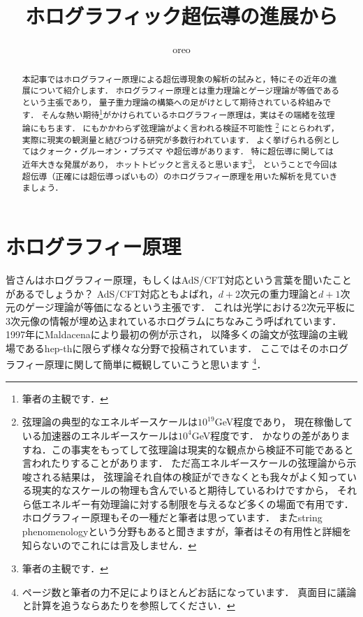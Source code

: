 \documentclass[b5paper,11pt,dvipdfmx]{jsarticle}
\numberwithin{equation}{section}
\theoremstyle{definition}
\begin{document}
\title{ホログラフィック超伝導の進展から}
\author{oreo}
\date{}

\maketitle


\begin{abstract}
    本記事ではホログラフィー原理による超伝導現象の解析の試みと，特にその近年の進展について紹介します．
    ホログラフィー原理とは重力理論とゲージ理論が等価であるという主張であり，
    量子重力理論の構築への足がけとして期待されている枠組みです．
    そんな熱い期待\footnote{筆者の主観です．}がかけられているホログラフィー原理は，実はその端緒を弦理論にもちます．
    にもかかわらず弦理論がよく言われる検証不可能性
    \footnote{弦理論の典型的なエネルギースケールは$10^{19}$GeV程度であり，
    現在稼働している加速器のエネルギースケールは$10^4$GeV程度です．
    かなりの差がありますね．この事実をもってして弦理論は現実的な観点から検証不可能であると言われたりすることがあります．
    ただ高エネルギースケールの弦理論から示唆される結果は，
    弦理論それ自体の検証ができなくとも我々がよく知っている現実的なスケールの物理も含んでいると期待しているわけですから，
    それら低エネルギー有効理論に対する制限を与えるなど多くの場面で有用です．
    ホログラフィー原理もその一種だと筆者は思っています．
    またstring phenomenologyという分野もあると聞きますが，筆者はその有用性と詳細を知らないのでこれには言及しません．}
    にとらわれず，実際に現実の観測量と結びつける研究が多数行われています．
    よく挙げられる例としてはクォーク・グルーオン・プラズマ\cite{Policastro01,Kovtun04}
    や超伝導\cite{Hartnoll08a,Hartnoll08b}があります．
    特に超伝導に関しては近年大きな発展があり，
    ホットトピックと言えると思います\footnote{筆者の主観です．}，
    ということで今回は超伝導（正確には超伝導っぽいもの）のホログラフィー原理を用いた解析を見ていきましょう．
\end{abstract}


\section{ホログラフィー原理}
皆さんはホログラフィー原理，もしくはAdS/CFT対応という言葉を聞いたことがあるでしょうか？
AdS/CFT対応ともよばれ，$d + 2$次元の重力理論と$d + 1$次元のゲージ理論が等価になるという主張です．
これは光学における2次元平板に3次元像の情報が埋め込まれているホログラムにちなみこう呼ばれています．
1997年にMaldacenaにより最初の例\cite{Maldacena97}が示され，
以降多くの論文が弦理論の主戦場であるhep-thに限らず様々な分野で投稿されています．
ここではそのホログラフィー原理に関して簡単に概観していこうと思います
\footnote{ページ数と筆者の力不足によりほとんどお話になっています．
真面目に議論と計算を追うなら\cite{Witten98,Aharony99,Bousso02,Ammon15}あたりを参照してください．}．
\end{document}
